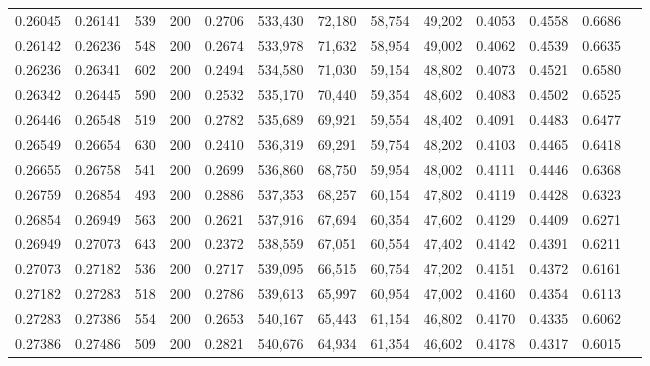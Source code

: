 \begin{tabular}{rrrrrrrrrrrrr}
0.26045 & 0.26141 &    539 & 200 &                                     0.2706 & 533,430 &  72,180 &  58,754 &  49,202 & 0.4053 & 0.4558 & 0.6686 \\
0.26142 & 0.26236 &    548 & 200 &                                     0.2674 & 533,978 &  71,632 &  58,954 &  49,002 & 0.4062 & 0.4539 & 0.6635 \\
0.26236 & 0.26341 &    602 & 200 &                                     0.2494 & 534,580 &  71,030 &  59,154 &  48,802 & 0.4073 & 0.4521 & 0.6580 \\
0.26342 & 0.26445 &    590 & 200 &                                     0.2532 & 535,170 &  70,440 &  59,354 &  48,602 & 0.4083 & 0.4502 & 0.6525 \\
0.26446 & 0.26548 &    519 & 200 &                                     0.2782 & 535,689 &  69,921 &  59,554 &  48,402 & 0.4091 & 0.4483 & 0.6477 \\
0.26549 & 0.26654 &    630 & 200 &                                     0.2410 & 536,319 &  69,291 &  59,754 &  48,202 & 0.4103 & 0.4465 & 0.6418 \\
0.26655 & 0.26758 &    541 & 200 &                                     0.2699 & 536,860 &  68,750 &  59,954 &  48,002 & 0.4111 & 0.4446 & 0.6368 \\
0.26759 & 0.26854 &    493 & 200 &                                     0.2886 & 537,353 &  68,257 &  60,154 &  47,802 & 0.4119 & 0.4428 & 0.6323 \\
0.26854 & 0.26949 &    563 & 200 &                                     0.2621 & 537,916 &  67,694 &  60,354 &  47,602 & 0.4129 & 0.4409 & 0.6271 \\
0.26949 & 0.27073 &    643 & 200 &                                     0.2372 & 538,559 &  67,051 &  60,554 &  47,402 & 0.4142 & 0.4391 & 0.6211 \\
0.27073 & 0.27182 &    536 & 200 &                                     0.2717 & 539,095 &  66,515 &  60,754 &  47,202 & 0.4151 & 0.4372 & 0.6161 \\
0.27182 & 0.27283 &    518 & 200 &                                     0.2786 & 539,613 &  65,997 &  60,954 &  47,002 & 0.4160 & 0.4354 & 0.6113 \\
0.27283 & 0.27386 &    554 & 200 &                                     0.2653 & 540,167 &  65,443 &  61,154 &  46,802 & 0.4170 & 0.4335 & 0.6062 \\
0.27386 & 0.27486 &    509 & 200 &                                     0.2821 & 540,676 &  64,934 &  61,354 &  46,602 & 0.4178 & 0.4317 & 0.6015 \\

\end{tabular}
